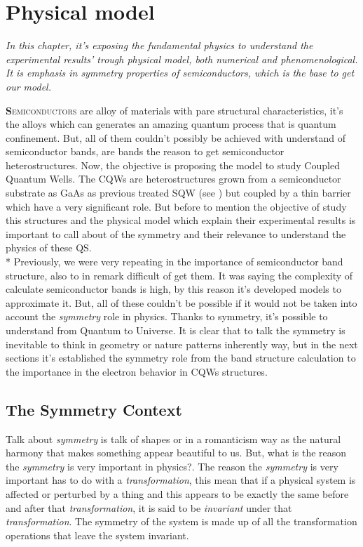 \chapter{Physical model}
\label{chap:Chapter-2}
\textit{In this chapter, it's exposing the fundamental physics to understand the experimental results' trough physical model, both numerical and phenomenological. It is emphasis in symmetry properties of semiconductors, which is the base to get our model.}
\vfill
\minitoc
\newpage

\lettrine[lines=3, lraise=.1, nindent=0mm, slope=0mm]{\textbf{S}}{emiconductors} are alloy of materials with pare structural characteristics, it's the alloys which can generates an amazing quantum process that is quantum confinement.  But, all of them  couldn't possibly be achieved with understand of semiconductor bands, are bands the reason to get semiconductor heterostructures. Now, the objective is proposing the model to study Coupled Quantum Wells. The CQWs are heterostructures grown from a semiconductor substrate as GaAs as previous treated SQW (see ) but coupled by a thin barrier which have a very significant role. But before to mention the objective of study this structures and the physical model which explain their experimental results  is important to call about of the symmetry and their relevance to understand the physics of these QS. \\*
Previously,  we were very repeating in the importance of semiconductor band structure, also to  in remark difficult of get them. It was saying the complexity of calculate semiconductor bands is high, by this reason it's developed models to approximate it. But, all of these couldn't be possible if it would not be taken into account the \emph{symmetry} role in physics\cite{van1989laws}. Thanks to symmetry, it's possible to understand from Quantum to Universe. It is clear that to talk the symmetry is inevitable to think in geometry or nature patterns  inherently way, but in the next sections it's established the symmetry role from the band structure calculation to  the importance in the electron behavior in CQWs structures. 




\section{The Symmetry Context}
\label{sec:chapter-2-from-symmetry}
\vspace{-10mm}
Talk about \emph{symmetry} is talk of shapes or in a romanticism way as  the natural harmony that makes something appear beautiful to us\cite{powell2010symmetry,tapp2021symmetry}. But, what is the reason the \emph{symmetry} is very important in physics?. The reason the  \emph{symmetry} is very important has to do with a \emph{transformation}, this mean that if a physical system is affected or perturbed by a thing and this appears to be exactly the same before and after that \emph{transformation}, it is said to be
\emph{invariant} under that \emph{transformation}. The symmetry of the system is made up of all the transformation operations that leave the system invariant\cite{powell2010symmetry}.

